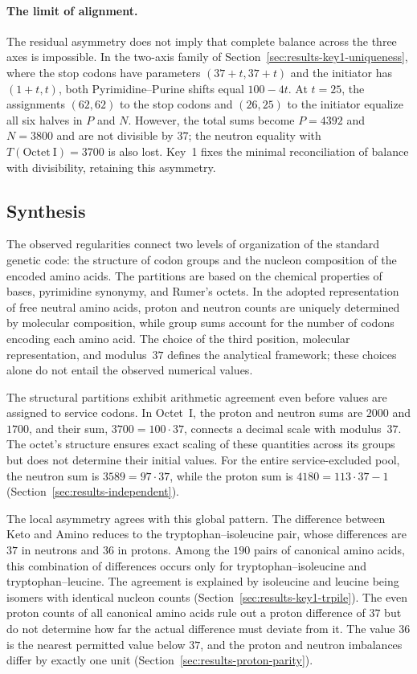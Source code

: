 \documentclass[11pt,a4paper]{article}
\renewcommand{\_}{\origunderscore\allowbreak}
\begin{document}
\paragraph{The limit of alignment.}
The residual asymmetry does not imply that complete
balance across the three axes is impossible. In the
two-axis family of Section~\ref{sec:results-key1-uniqueness},
where the stop codons have parameters $(37+t,37+t)$
and the initiator has $(1+t,t)$, both
Pyrimidine--Purine shifts equal $100-4t$. At $t=25$,
the assignments $(62,62)$ to the stop codons and
$(26,25)$ to the initiator equalize all six halves
in $P$ and $N$. However, the total sums become
$P=4392$ and $N=3800$ and are not divisible by $37$;
the neutron equality with $T(\mathrm{Octet~I})=3700$
is also lost. Key~1 fixes the minimal reconciliation
of balance with divisibility, retaining this asymmetry.

\subsection{Synthesis}
\label{sec:results-synthesis}

The observed regularities connect two levels of organization
of the standard genetic code: the structure of codon groups
and the nucleon composition of the encoded amino acids.
The partitions are based on the chemical properties of bases,
pyrimidine synonymy, and Rumer's octets. In the adopted
representation of free neutral amino acids, proton and neutron
counts are uniquely determined by molecular composition,
while group sums account for the number of codons encoding
each amino acid. The choice of the third position, molecular
representation, and modulus~$37$ defines the analytical
framework; these choices alone do not entail the observed
numerical values.

The structural partitions exhibit arithmetic agreement
even before values are assigned to service codons.
In Octet~I, the proton and neutron sums are $2000$ and $1700$,
and their sum, $3700=100\cdot37$, connects a decimal scale
with modulus~$37$. The octet's structure ensures exact
scaling of these quantities across its groups but does not
determine their initial values. For the entire service-excluded
pool, the neutron sum is $3589=97\cdot37$, while the proton
sum is $4180=113\cdot37-1$
(Section~\ref{sec:results-independent}).

The local asymmetry agrees with this global pattern.
The difference between Keto and Amino reduces to the
tryptophan--isoleucine pair, whose differences are $37$
in neutrons and $36$ in protons. Among the $190$ pairs
of canonical amino acids, this combination of differences
occurs only for tryptophan--isoleucine and
tryptophan--leucine. The agreement is explained by
isoleucine and leucine being isomers with identical
nucleon counts
(Section~\ref{sec:results-key1-trpile}).
The even proton counts of all canonical amino acids
rule out a proton difference of $37$ but do not determine
how far the actual difference must deviate from it.
The value $36$ is the nearest permitted value below $37$,
and the proton and neutron imbalances differ by exactly
one unit
(Section~\ref{sec:results-proton-parity}).
\end{document}
